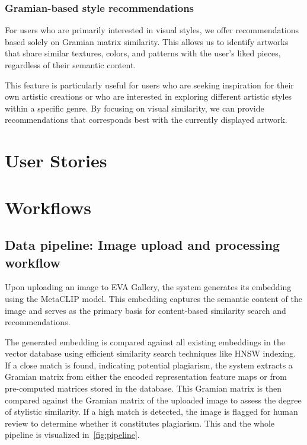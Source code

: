 \subsection{Gramian-based style recommendations}
For users who are primarily interested in visual styles, we offer recommendations based solely on Gramian matrix similarity. This allows us to identify artworks that share similar textures, colors, and patterns with the user's liked pieces, regardless of their semantic content.

This feature is particularly useful for users who are seeking inspiration for their own artistic creations or who are interested in exploring different artistic styles within a specific genre. By focusing on visual similarity, we can provide recommendations that corresponds best with the currently displayed artwork.

\newpage

\chapter{User Stories}
\chapter{Workflows}
\section{Data pipeline: Image upload and processing workflow}

Upon uploading an image to EVA Gallery, the system generates its embedding using the MetaCLIP model. This embedding captures the semantic content of the image and serves as the primary basis for content-based similarity search and recommendations.

The generated embedding is compared against all existing embeddings in the vector database using efficient similarity search techniques like HNSW indexing. If a close match is found, indicating potential plagiarism, the system extracts a Gramian matrix from either the encoded representation feature maps or from pre-computed matrices stored in the database. This Gramian matrix is then compared against the Gramian matrix of the uploaded image to assess the degree of stylistic similarity. If a high match is detected, the image is flagged for human review to determine whether it constitutes plagiarism. This and the whole pipeline is visualized in~\autoref{fig:pipeline}.

